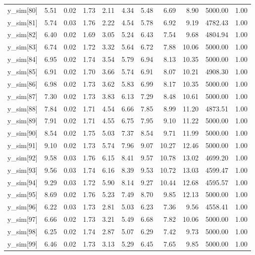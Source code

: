 \begin{table}[ht]
\begin{tabular}{rrrrrrrrrrr}
  y\_sim[80] & 5.51 & 0.02 & 1.73 & 2.11 & 4.34 & 5.48 & 6.69 & 8.90 & 5000.00 & 1.00 \\ 
  y\_sim[81] & 5.74 & 0.03 & 1.76 & 2.22 & 4.54 & 5.78 & 6.92 & 9.19 & 4782.43 & 1.00 \\ 
  y\_sim[82] & 6.40 & 0.02 & 1.69 & 3.05 & 5.24 & 6.43 & 7.54 & 9.68 & 4804.94 & 1.00 \\ 
  y\_sim[83] & 6.74 & 0.02 & 1.72 & 3.32 & 5.64 & 6.72 & 7.88 & 10.06 & 5000.00 & 1.00 \\ 
  y\_sim[84] & 6.95 & 0.02 & 1.74 & 3.54 & 5.79 & 6.94 & 8.13 & 10.35 & 5000.00 & 1.00 \\ 
  y\_sim[85] & 6.91 & 0.02 & 1.70 & 3.66 & 5.74 & 6.91 & 8.07 & 10.21 & 4908.30 & 1.00 \\ 
  y\_sim[86] & 6.98 & 0.02 & 1.73 & 3.62 & 5.83 & 6.99 & 8.17 & 10.35 & 5000.00 & 1.00 \\ 
  y\_sim[87] & 7.30 & 0.02 & 1.73 & 3.83 & 6.13 & 7.29 & 8.48 & 10.61 & 5000.00 & 1.00 \\ 
  y\_sim[88] & 7.84 & 0.02 & 1.71 & 4.54 & 6.66 & 7.85 & 8.99 & 11.20 & 4873.51 & 1.00 \\ 
  y\_sim[89] & 7.91 & 0.02 & 1.71 & 4.55 & 6.75 & 7.95 & 9.10 & 11.22 & 5000.00 & 1.00 \\ 
  y\_sim[90] & 8.54 & 0.02 & 1.75 & 5.03 & 7.37 & 8.54 & 9.71 & 11.99 & 5000.00 & 1.00 \\ 
  y\_sim[91] & 9.10 & 0.02 & 1.73 & 5.74 & 7.96 & 9.07 & 10.27 & 12.46 & 5000.00 & 1.00 \\ 
  y\_sim[92] & 9.58 & 0.03 & 1.76 & 6.15 & 8.41 & 9.57 & 10.78 & 13.02 & 4699.20 & 1.00 \\ 
  y\_sim[93] & 9.56 & 0.03 & 1.74 & 6.16 & 8.39 & 9.53 & 10.72 & 13.03 & 4599.47 & 1.00 \\ 
  y\_sim[94] & 9.29 & 0.03 & 1.72 & 5.90 & 8.14 & 9.27 & 10.44 & 12.68 & 4595.57 & 1.00 \\ 
  y\_sim[95] & 8.69 & 0.02 & 1.76 & 5.23 & 7.49 & 8.70 & 9.85 & 12.13 & 5000.00 & 1.00 \\ 
  y\_sim[96] & 6.22 & 0.03 & 1.73 & 2.81 & 5.03 & 6.23 & 7.36 & 9.56 & 4558.41 & 1.00 \\ 
  y\_sim[97] & 6.66 & 0.02 & 1.73 & 3.21 & 5.49 & 6.68 & 7.82 & 10.06 & 5000.00 & 1.00 \\ 
  y\_sim[98] & 6.25 & 0.02 & 1.74 & 2.87 & 5.07 & 6.29 & 7.42 & 9.73 & 5000.00 & 1.00 \\ 
  y\_sim[99] & 6.46 & 0.02 & 1.73 & 3.13 & 5.29 & 6.45 & 7.65 & 9.85 & 5000.00 & 1.00 \\ 

\end{tabular}
\end{table}
